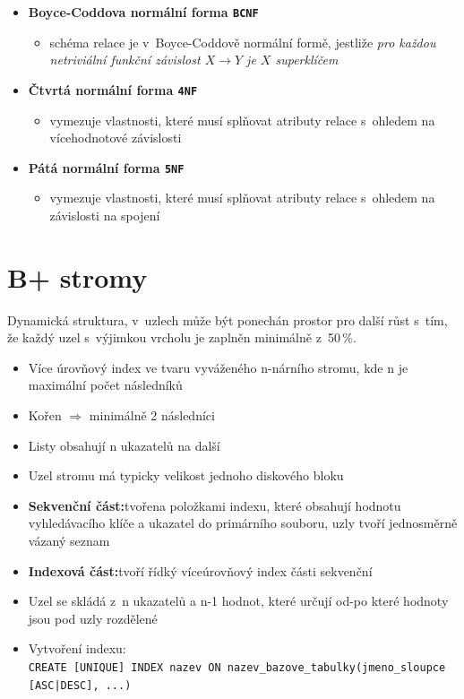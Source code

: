 \documentclass[a4paper,10pt]{article}
\newcommand{\pojem}[2]{\item \textbf{#1:}\quad #2}
\newcommand{\tedy}{$\Rightarrow$ }
\begin{document}
\begin{itemize}
				\item \textbf{Boyce-Coddova normální forma \texttt{BCNF}}
				\begin{itemize}
					\item schéma relace je v~Boyce-Coddově normální formě, jestliže \emph{pro každou netriviální funkční závislost $X \rightarrow Y$ je $X$ superklíčem}
				\end{itemize}

				\item \textbf{Čtvrtá normální forma \texttt{4NF}}
				\begin{itemize}
					\item vymezuje vlastnosti, které musí splňovat atributy relace s~ohledem na vícehodnotové závislosti
				\end{itemize}

				\item \textbf{Pátá normální forma \texttt{5NF}}
				\begin{itemize}
					\item vymezuje vlastnosti, které musí splňovat atributy relace s~ohledem na závislosti na spojení
				\end{itemize}
			\end{itemize}

	\section{B+ stromy}
	Dynamická struktura, v~uzlech může být ponechán prostor pro další růst s~tím, že každý uzel s~výjimkou vrcholu je zaplněn minimálně z~50\,\%.
	\begin{itemize}
		\item Více úrovňový index ve tvaru vyváženého n-nárního stromu, kde n je maximální počet následníků
		\item Kořen \tedy minimálně 2 následníci
		\item Listy obsahují n ukazatelů na další
		\item Uzel stromu má typicky velikost jednoho diskového bloku
		\pojem{Sekvenční část}{tvořena položkami indexu, které obsahují hodnotu vyhledávacího klíče a ukazatel do primárního souboru, uzly tvoří jednosměrně vázaný seznam}
		\pojem{Indexová část}{tvoří řídký víceúrovňový index části sekvenční}
		\item Uzel se skládá z~n ukazatelů a n-1 hodnot, které určují od-po které hodnoty jsou pod uzly rozdělené
		\item Vytvoření indexu: \\ \texttt{CREATE [UNIQUE] INDEX nazev ON nazev\_bazove\_tabulky(jmeno\_sloupce [ASC|DESC], ...)}
	\end{itemize}
\end{document}
